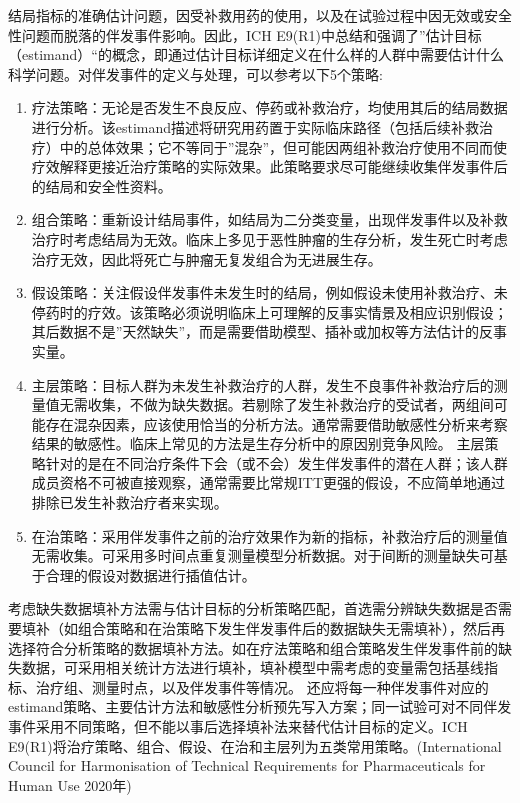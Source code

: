 \documentclass[
  chinese-hans,
  letterpaper,
  DIV=11,
  numbers=noendperiod]{scrreprt}
\begin{document}
结局指标的准确估计问题，因受补救用药的使用，以及在试验过程中因无效或安全性问题而脱落的伴发事件影响。因此，ICH
E9(R1)中总结和强调了''估计目标（estimand）``的概念，即通过估计目标详细定义在什么样的人群中需要估计什么科学问题。对伴发事件的定义与处理，可以参考以下5个策略:

\begin{enumerate}
\def\labelenumi{\arabic{enumi}.}
\item
  疗法策略：无论是否发生不良反应、停药或补救治疗，均使用其后的结局数据进行分析。该estimand描述将研究用药置于实际临床路径（包括后续补救治疗）中的总体效果；它不等同于''混杂''，但可能因两组补救治疗使用不同而使疗效解释更接近治疗策略的实际效果。此策略要求尽可能继续收集伴发事件后的结局和安全性资料。
\item
  组合策略：重新设计结局事件，如结局为二分类变量，出现伴发事件以及补救治疗时考虑结局为无效。临床上多见于恶性肿瘤的生存分析，发生死亡时考虑治疗无效，因此将死亡与肿瘤无复发组合为无进展生存。
\item
  假设策略：关注假设伴发事件未发生时的结局，例如假设未使用补救治疗、未停药时的疗效。该策略必须说明临床上可理解的反事实情景及相应识别假设；其后数据不是''天然缺失''，而是需要借助模型、插补或加权等方法估计的反事实量。
\item
  主层策略：目标人群为未发生补救治疗的人群，发生不良事件补救治疗后的测量值无需收集，不做为缺失数据。若剔除了发生补救治疗的受试者，两组间可能存在混杂因素，应该使用恰当的分析方法。通常需要借助敏感性分析来考察结果的敏感性。临床上常见的方法是生存分析中的原因别竞争风险。
  主层策略针对的是在不同治疗条件下会（或不会）发生伴发事件的潜在人群；该人群成员资格不可被直接观察，通常需要比常规ITT更强的假设，不应简单地通过排除已发生补救治疗者来实现。
\item
  在治策略：采用伴发事件之前的治疗效果作为新的指标，补救治疗后的测量值无需收集。可采用多时间点重复测量模型分析数据。对于间断的测量缺失可基于合理的假设对数据进行插值估计。
\end{enumerate}

考虑缺失数据填补方法需与估计目标的分析策略匹配，首选需分辨缺失数据是否需要填补（如组合策略和在治策略下发生伴发事件后的数据缺失无需填补），然后再选择符合分析策略的数据填补方法。如在疗法策略和组合策略发生伴发事件前的缺失数据，可采用相关统计方法进行填补，填补模型中需考虑的变量需包括基线指标、治疗组、测量时点，以及伴发事件等情况。
还应将每一种伴发事件对应的estimand策略、主要估计方法和敏感性分析预先写入方案；同一试验可对不同伴发事件采用不同策略，但不能以事后选择填补法来替代估计目标的定义。ICH
E9(R1)将治疗策略、组合、假设、在治和主层列为五类常用策略。(International
Council for Harmonisation of Technical Requirements for Pharmaceuticals
for Human Use 2020年)
\end{document}
